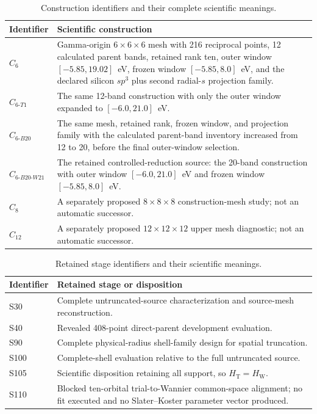 \documentclass[11pt]{report}
\begin{document}
\begin{table}[htbp]
\centering
\small
\begin{tabular}{@{}p{}p{}@{}}
\toprule
Identifier & Scientific construction \\
\midrule
$C_6$ & Gamma-origin $6\times6\times6$ mesh with 216 reciprocal points,
12 calculated parent bands, retained rank ten, outer window
$[-5.85,19.02]$~eV, frozen window $[-5.85,8.0]$~eV, and the declared
silicon $sp^3$ plus second radial-$s$ projection family. \\
$C_{6\text{-}T1}$ & The same 12-band construction with only the outer window
expanded to $[-6.0,21.0]$~eV. \\
$C_{6\text{-}B20}$ & The same mesh, retained rank, frozen window, and projection
family with the calculated parent-band inventory increased from 12 to 20, before the
final outer-window selection. \\
$C_{6\text{-}B20\text{-}W21}$ & The retained controlled-reduction source: the
20-band construction with outer window $[-6.0,21.0]$~eV and frozen window
$[-5.85,8.0]$~eV. \\
$C_8$ & A separately proposed $8\times8\times8$ construction-mesh study; not an
automatic successor. \\
$C_{12}$ & A separately proposed $12\times12\times12$ upper mesh diagnostic; not an
automatic successor. \\
\bottomrule
\end{tabular}
\caption{Construction identifiers and their complete scientific meanings.}
\end{table}

\begin{table}[htbp]
\centering
\small
\begin{tabular}{@{}p{}p{}@{}}
\toprule
Identifier & Retained stage or disposition \\
\midrule
S30 & Complete untruncated-source characterization and source-mesh reconstruction. \\
S40 & Revealed 408-point direct-parent development evaluation. \\
S90 & Complete physical-radius shell-family design for spatial truncation. \\
S100 & Complete-shell evaluation relative to the full untruncated source. \\
S105 & Scientific disposition retaining all support, so
$H_{\mathrm{T}}=H_{\mathrm{W}}$. \\
S110 & Blocked ten-orbital trial-to-Wannier common-space alignment; no fit executed and
no Slater--Koster parameter vector produced. \\
\bottomrule
\end{tabular}
\caption{Retained stage identifiers and their scientific meanings.}
\end{table}
\end{document}
